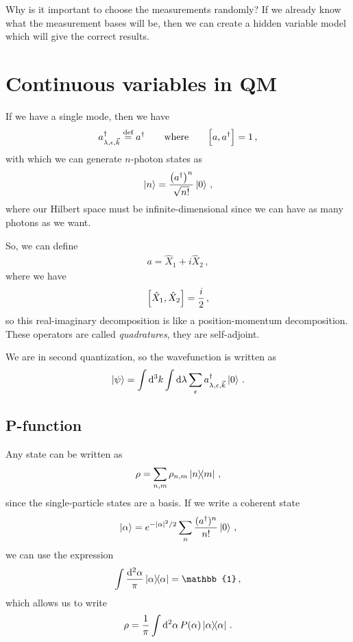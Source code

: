 \documentclass[main.tex]{subfiles}
\begin{document}

Why is it important to choose the measurements randomly? 
If we already know what the measurement bases will be, then we can create a hidden variable model which will give the correct results. 

\section{Continuous variables in QM}

If we have a single mode, then we have 
%
\begin{align}
a ^\dag_{\lambda, \epsilon , \vec{k}} \overset{\text{def}}{=} a ^\dag
\qquad \text{where} \qquad
\qty[a, a  ^\dag] = 1
\,,
\end{align}
%
with which we can generate \(n\)-photon states as 
%
\begin{align}
\ket{n} = \frac{\qty(a ^\dag)^{n}}{\sqrt{n!}} \ket{0}
\,,
\end{align}
%
where our Hilbert space must be infinite-dimensional since we can have as many photons as we want. 

So, we can define 
%
\begin{align}
a = \hat{X}_{1} + i \hat{X}_{2}
\,,
\end{align}
%
where we have 
%
\begin{align}
\qty[\hat{X}_{1}, \hat{X}_{2}] = \frac{i}{2}
\,,
\end{align}
%
so this real-imaginary decomposition is like a position-momentum decomposition. 
These operators are called \emph{quadratures}, they are self-adjoint.

We are in second quantization, so the wavefunction is written as 
%
\begin{align}
\ket{\psi } = \int \dd[3]{k} \int \dd{\lambda } \sum_{\epsilon } a ^\dag_{\lambda, \epsilon , \vec{k}} \ket{0}
\,.
\end{align}

\subsection{P-function}

Any state can be written as 
%
\begin{align}
\rho = \sum _{n, m} \rho_{n, m} \ketbra{n}{m}
\,,
\end{align}
%
since the single-particle states are a basis. 
If we write a coherent state 
%
\begin{align}
\ket{\alpha } = e^{- \abs{\alpha }^2/2} \sum _{n} \frac{(a ^\dag)^{n}}{n!} \ket{0}
\,,
\end{align}
%
we can use the expression 
%
\begin{align}
\int \frac{ \dd[2]{\alpha }}{\pi } \dyad{\alpha } = \mathbb{1}
\,,
\end{align}
%
which allows us to write 
%
\begin{align}
\rho = \frac{1}{\pi } \int \dd[2]{\alpha} P(\alpha ) \dyad{\alpha }
\,.
\end{align}
\end{document}
